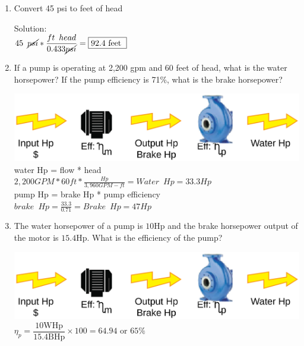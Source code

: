 \documentclass{article}
\begin{document}
\begin{enumerate}
\item Convert 45 psi to feet of head

Solution:\\ 
$
45 \enspace \cancel{psi}*\dfrac{ft \enspace head}{0.433\cancel{psi}}=\boxed{92.4 \text { feet }}
$


\item If a pump is operating at 2,200 gpm and 60 feet of head, what is the water
horsepower? If the pump efficiency is 71\%, what is the brake horsepower?

\vspace{0.4cm}

\vspace{0.4cm}\includegraphics[scale=0.08]{PumpProblem}\\
\vspace{0.4cm}
water Hp = flow * head\\
\vspace{0.4cm}
$2,200GPM*60ft*\frac{Hp}{3,960 GPM-ft}=\boxed{Water \enspace Hp = 33.3Hp}$\\
\vspace{0.4cm}
pump Hp = brake Hp * pump efficiency\\
\vspace{0.4cm}
$brake \enspace Hp = \frac{33.3}{0.71}=\boxed{Brake \enspace Hp=47Hp}$


\item The water horsepower of a pump is $10 \mathrm{Hp}$ and the brake horsepower output of the motor is $15.4 \mathrm{Hp}$. What is the efficiency of the pump?

\vspace{0.4cm}\includegraphics[scale=0.08]{PumpProblem}\\
\vspace{0.4cm}
 $\eta_p=\dfrac{10 \mathrm{WHp}}{15.4 \mathrm{BHp}} \times 100=64.94$ or $\boxed{65 \%}$



\end{enumerate}
\end{document}
